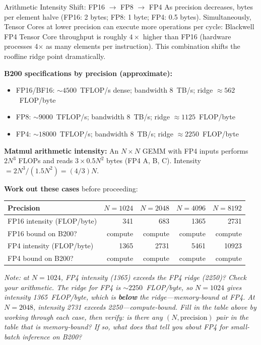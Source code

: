 \begin{thinkfirst}{Arithmetic Intensity Shift: FP16 $\to$ FP8 $\to$ FP4}
As precision decreases, bytes per element halve (FP16: 2 bytes; FP8: 1 byte; FP4: 0.5 bytes). Simultaneously, Tensor Cores at lower precision can execute more operations per cycle: Blackwell FP4 Tensor Core throughput is roughly $4\times$ higher than FP16 (hardware processes 4$\times$ as many elements per instruction). This combination shifts the roofline ridge point dramatically.

\textbf{B200 specifications by precision (approximate):}
\begin{itemize}
  \item FP16/BF16: $\sim 4500$~TFLOP/s dense; bandwidth 8~TB/s; ridge $\approx 562$~FLOP/byte
  \item FP8: $\sim 9000$~TFLOP/s; bandwidth 8~TB/s; ridge $\approx 1125$~FLOP/byte
  \item FP4: $\sim 18000$~TFLOP/s; bandwidth 8~TB/s; ridge $\approx 2250$~FLOP/byte
\end{itemize}

\textbf{Matmul arithmetic intensity:} An $N \times N$ GEMM with FP4 inputs performs $2N^3$ FLOPs and reads $3 \times 0.5N^2$ bytes (FP4 A, B, C). Intensity $= 2N^3 / (1.5N^2) = (4/3)N$.

\textbf{Work out these cases} before proceeding:

\begin{center}
\begin{tabular}{lrrrr}
\hline
\textbf{Precision} & $N=1024$ & $N=2048$ & $N=4096$ & $N=8192$ \\
\hline
FP16 intensity (FLOP/byte) & 341 & 683 & 1365 & 2731 \\
FP16 bound on B200? & compute & compute & compute & compute \\
FP4 intensity (FLOP/byte) & 1365 & 2731 & 5461 & 10923 \\
FP4 bound on B200? & compute & compute & compute & compute \\
\hline
\end{tabular}
\end{center}

\textit{Note: at $N=1024$, FP4 intensity (1365) exceeds the FP4 ridge (2250)? Check your arithmetic. The ridge for FP4 is $\sim 2250$~FLOP/byte, so $N=1024$ gives intensity 1365~FLOP/byte, which is \textbf{below} the ridge---memory-bound at FP4. At $N=2048$, intensity 2731 exceeds 2250---compute-bound. Fill in the table above by working through each case, then verify: is there any $(N, \text{precision})$ pair in the table that is memory-bound? If so, what does that tell you about FP4 for small-batch inference on B200?}


\end{thinkfirst}
